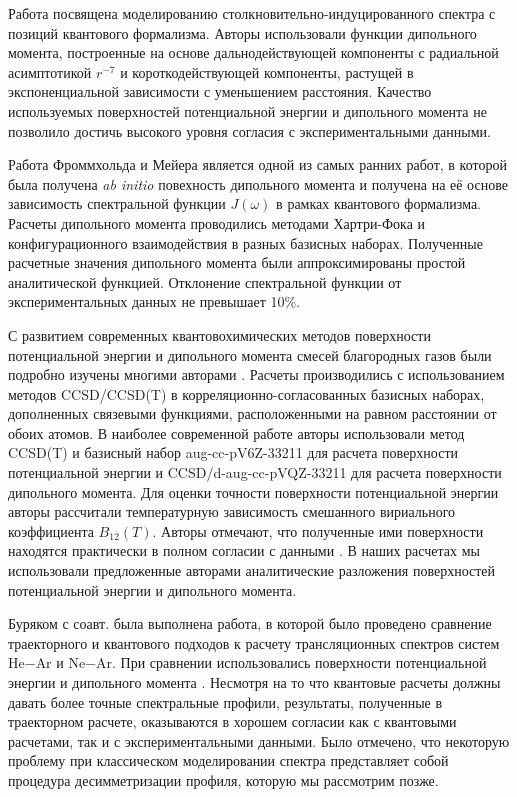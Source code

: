 Работа \cite{sharma1975} посвящена моделированию столкновительно-индуцированного спектра с позиций квантового формализма. Авторы использовали функции дипольного момента, построенные на основе дальнодействующей компоненты с радиальной асимптотикой $r^{-7}$ и короткодействующей компоненты, растущей в экспоненциальной зависимости с уменьшением расстояния. Качество используемых поверхностей потенциальной энергии и дипольного момента не позволило достичь высокого уровня согласия с экспериментальными данными. \par
Работа \cite{meyer1986} Фроммхольда и Мейера является одной из самых ранних работ, в которой была получена \textit{ab initio} повехность дипольного момента и получена на её основе зависимость спектральной функции $J(\omega)$ в рамках квантового формализма. Расчеты дипольного момента проводились методами Хартри-Фока и конфигурационного взаимодействия в разных базисных наборах. Полученные расчетные значения дипольного момента были аппроксимированы простой аналитической функцией. Отклонение спектральной функции от экспериментальных данных не превышает 10\%. \par 
С развитием современных квантовохимических методов поверхности потенциальной энергии и дипольного момента смесей благородных газов были подробно изучены многими авторами \cite{cybulski1999, giece2003, fernandez2004}. Расчеты производились с использованием методов CCSD/CCSD(T) в корреляционно-согласованных базисных наборах, дополненных связевыми функциями, расположенными на равном расстоянии от обоих атомов. В наиболее современной работе\cite{fernandez2004} авторы использовали метод CCSD(T) и базисный набор aug-cc-pV6Z-33211 для расчета поверхности потенциальной энергии и CCSD/d-aug-cc-pVQZ-33211 для расчета поверхности дипольного момента. Для оценки точности поверхности потенциальной энергии авторы рассчитали температурную зависимость смешанного вириального коэффициента $B_{12}(T)$. Авторы отмечают, что полученные ими поверхности находятся практически в полном согласии с данными \cite{cybulski1999}. В наших расчетах мы использовали предложенные авторами аналитические разложения поверхностей потенциальной энергии и дипольного момента. \par
Буряком с соавт. \cite{buryak2014} была выполнена работа, в которой было проведено сравнение траекторного и квантового подходов к расчету трансляционных спектров систем He$-$Ar и Ne$-$Ar. При сравнении использовались поверхности потенциальной энергии \cite{fernandez2004} и дипольного момента \cite{fernandez2004, meyer1986}. Несмотря на то что квантовые расчеты должны давать более точные спектральные профили, результаты, полученные в траекторном расчете, оказываются в хорошем согласии как с квантовыми расчетами, так и с экспериментальными данными. Было отмечено, что некоторую проблему при классическом моделировании спектра представляет собой процедура десимметризации профиля, которую мы рассмотрим позже. \par

